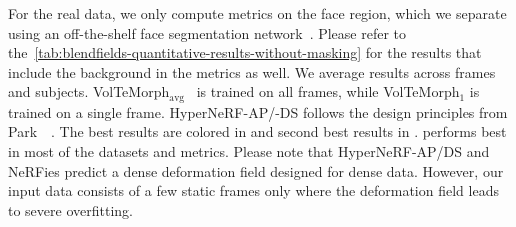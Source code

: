 \begin{table}[!t]
{    For the real data, we only compute metrics on the face region, which we
    separate using an off-the-shelf face segmentation network~\cite{wood2021fake}.
    Please refer to
    the~\cref{tab:blendfields-quantitative-results-without-masking} for the
    results that include the background in the metrics as well.
    We average results across frames and subjects.
    VolTeMorph$_{\text{avg}}$~\cite{garbin2024voltemorph} is trained on all
    frames, while VolTeMorph$_1$ is trained on a single frame.
    HyperNeRF-AP/-DS follows the design principles from
    Park~\etal~\cite{park2021hypernerf}.
    The best results are colored in  and second best
    results in .
    \blendfields performs best in most of the datasets and metrics.
    Please note that HyperNeRF-AP/DS and NeRFies predict a dense deformation field
    designed for dense data.
    However, our input data consists of a few static frames only where the
    deformation field leads to severe overfitting.
  }
  \label{tab:blendfields-quantitative-results}
\end{table}

